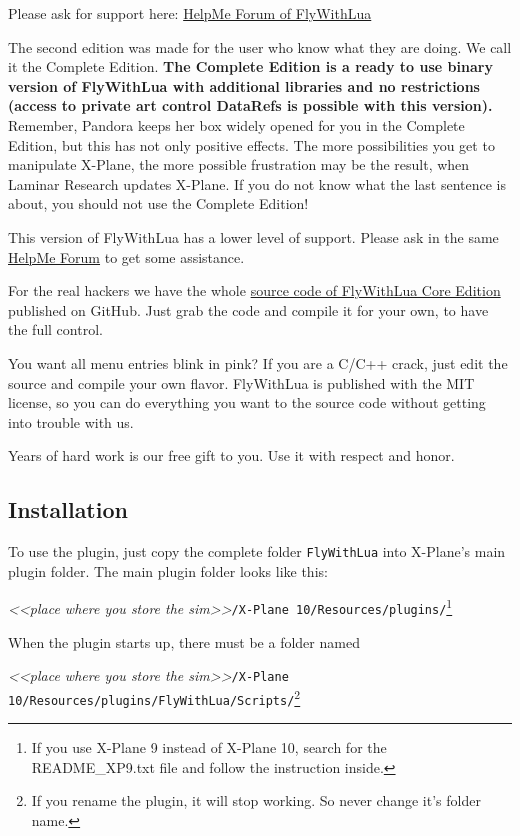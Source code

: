 \documentclass[11pt,parskip=half,a4paper]{scrartcl}
\begin{document}
Please ask for support here: \href{http://forums.x-plane.org/index.php?/forums/forum/335-help-me-i-have-a-problem-with-flywithlua/}{HelpMe Forum of FlyWithLua}

The second edition was made for the user who know what they are doing. We call it the Complete Edition. \textbf{The Complete Edition is a ready to use binary version of FlyWithLua with additional libraries and no restrictions (access to private art control DataRefs is possible with this version).} Remember, Pandora keeps her box widely opened for you in the Complete Edition, but this has not only positive effects. The more possibilities you get to manipulate X-Plane, the more possible frustration may be the result, when Laminar Research updates X-Plane. If you do not know what the last sentence is about, you should not use the Complete Edition!

This version of FlyWithLua has a lower level of support. Please ask in the same \href{http://forums.x-plane.org/index.php?/forums/forum/335-help-me-i-have-a-problem-with-flywithlua/}{HelpMe Forum} to get some assistance.

For the real hackers we have the whole \href{https://github.com/X-Friese/FlyWithLua}{source code of FlyWithLua Core Edition} published on GitHub. Just grab the code and compile it for your own, to have the full control.

You want all menu entries blink in pink? If you are a C/C++ crack, just edit the source and compile your own flavor. FlyWithLua is published with the MIT license, so you can do everything you want to the source code without getting into trouble with us.

Years of hard work is our free gift to you. Use it with respect and honor.

\subsection{Installation}

To use the plugin, just copy the complete folder \verb|FlyWithLua| into X-Plane's main plugin folder. The main plugin folder looks like this:

\emph{<<place where you store the sim>>}\verb|/X-Plane 10/Resources/plugins/|\footnote{If you use X-Plane 9 instead of X-Plane 10, search for the README\_XP9.txt file and follow the instruction inside.}

When the plugin starts up, there must be a folder named

\emph{<<place where you store the sim>>}\verb|/X-Plane 10/Resources/plugins/FlyWithLua/Scripts/|\footnote{If you rename the plugin, it will stop working. So never change it's folder name.}
\end{document}
